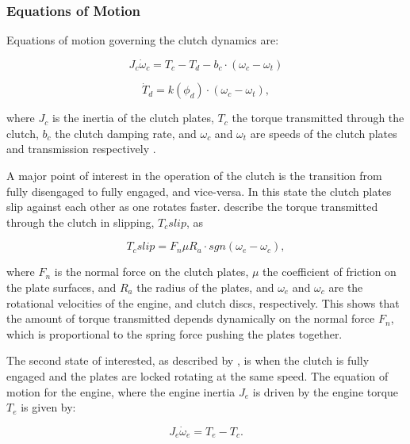 \subsubsection{Equations of Motion}

Equations of motion governing the clutch dynamics are:

\begin{equation}\label{eq:clutch_dynamics_a}
  J_c\dot{\omega}_c=T_c-T_d-b_c\cdot\left(\omega_c-\omega_t\right)
\end{equation}

\begin{equation}\label{eq:clutch_dynamics_b}
  \dot{T}_d=k\left(\phi_d\right)\cdot\left(\omega_c-\omega_t\right),
\end{equation}

where $J_c$ is the inertia of the clutch plates, $T_c$ the torque transmitted through the clutch, $b_c$ the clutch damping rate, and $\omega_c$ and $\omega_t$ are speeds of the clutch plates and transmission respectively \cite{clutch_control}.

A major point of interest in the operation of the clutch is the transition from fully disengaged to fully engaged, and vice-versa. In this state the clutch plates slip against each other as one rotates faster.  describe the torque transmitted through the clutch in slipping, $T_c{slip}$, as

\begin{equation}\label{eq:clutch_slip}
  T_c{slip}=F_n\mu R_a \cdot sgn\left(\omega_e-\omega_c\right),
\end{equation}

where $F_n$ is the normal force on the clutch plates, $\mu$ the coefficient of friction on the plate surfaces, and $R_a$ the radius of the plates, and $\omega_e$ and $\omega_c$ are the rotational velocities of the engine, and clutch discs, respectively. This shows that the amount of torque transmitted depends dynamically on the normal force $F_n$, which is proportional to the spring force pushing the plates together.

The second state of interested, as described by \cite{clutch_control}, is when the clutch is fully engaged and the plates are locked rotating at the same speed. The equation of motion for the engine, where the engine inertia $J_e$ is driven by the engine torque $T_e$ is given by:

\begin{equation}\label{eq:engine_motion}
  J_e\dot{\omega}_e=T_e-T_c.
\end{equation}

